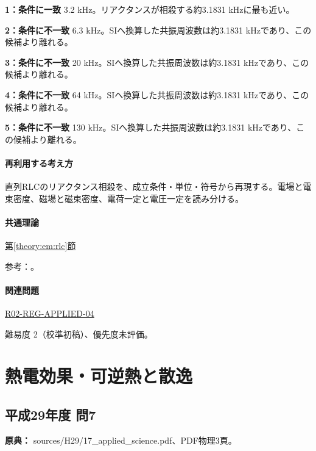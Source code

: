 \noindent\textbf{1：条件に一致} 3.2 kHz。リアクタンスが相殺する約3.1831 kHzに最も近い。\par

\noindent\textbf{2：条件に不一致} 6.3 kHz。SIへ換算した共振周波数は約3.1831 kHzであり、この候補より離れる。\par

\noindent\textbf{3：条件に不一致} 20 kHz。SIへ換算した共振周波数は約3.1831 kHzであり、この候補より離れる。\par

\noindent\textbf{4：条件に不一致} 64 kHz。SIへ換算した共振周波数は約3.1831 kHzであり、この候補より離れる。\par

\noindent\textbf{5：条件に不一致} 130 kHz。SIへ換算した共振周波数は約3.1831 kHzであり、この候補より離れる。\par

\paragraph{再利用する考え方} 直列RLCのリアクタンス相殺を、成立条件・単位・符号から再現する。電場と電束密度、磁場と磁束密度、電荷一定と電圧一定を読み分ける。

\paragraph{共通理論} \hyperref[theory:em:rlc]{第\ref*{theory:em:rlc}節}

\par 参考：\cite{mit_em12}。

\paragraph{関連問題} \hyperref[q:r02-reg-applied-04]{R02-REG-APPLIED-04}

\par 難易度 2（校準初稿）、優先度未評価。

\section{熱電効果・可逆熱と散逸}

\subsection{平成29年度 問7}
\label{q:h29-reg-applied-07}

\noindent\textbf{原典：} sources/H29/17\_applied\_science.pdf、PDF物理3頁。

